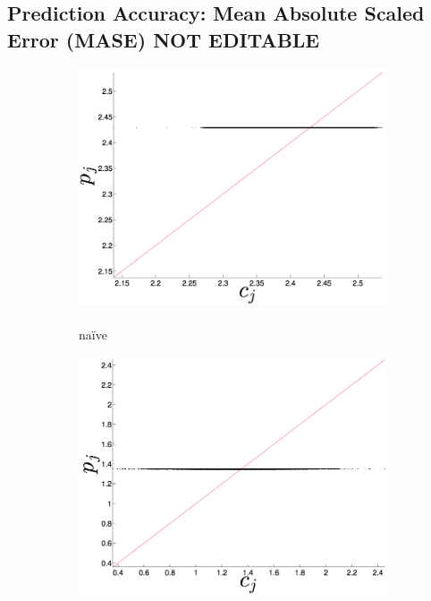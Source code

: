 




\subsection{Prediction Accuracy: Mean Absolute Scaled Error (MASE) {\color{red} NOT EDITABLE}}
\label{sec:accuracy}







\begin{figure}[htbp]
  \centering
      \begin{subfigure}{0.33\columnwidth}
    \includegraphics[width=\columnwidth]{figs/colMeanForecast.png}
    \caption{\col\\ na\"ive }
    \label{fig:gccMEAN}
  \end{subfigure}%
   \begin{subfigure}{0.32\columnwidth}
    \includegraphics[width=\columnwidth]{figs/gccMeanForecast.png}

\end{subfigure}
\end{figure}
